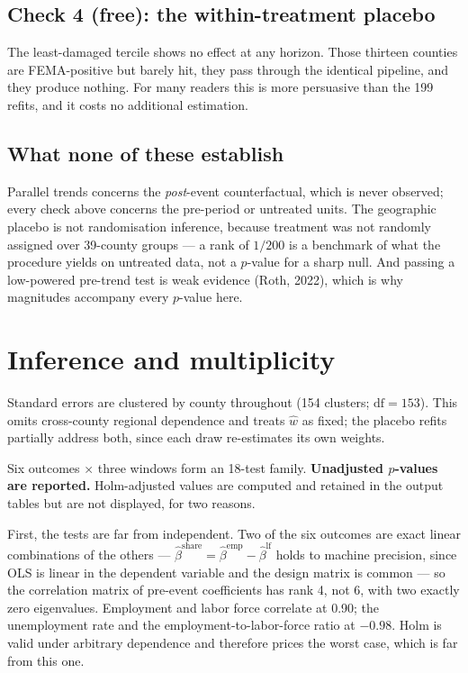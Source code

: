 \documentclass[11pt,a4paper]{article}
\begin{document}
\subsection{Check 4 (free): the within-treatment placebo}
The least-damaged tercile shows no effect at any horizon. Those thirteen counties are FEMA-positive but
barely hit, they pass through the identical pipeline, and they produce nothing. For many readers this
is more persuasive than the 199 refits, and it costs no additional estimation.

\subsection{What none of these establish}
Parallel trends concerns the \emph{post}-event counterfactual, which is never observed; every check
above concerns the pre-period or untreated units. The geographic placebo is not randomisation
inference, because treatment was not randomly assigned over 39-county groups --- a rank of $1/200$ is a
benchmark of what the procedure yields on untreated data, not a $p$-value for a sharp null. And passing
a low-powered pre-trend test is weak evidence (Roth, 2022), which is why magnitudes accompany every
$p$-value here.

\section{Inference and multiplicity}\label{sec:multiplicity}

Standard errors are clustered by county throughout (154 clusters; $\mathrm{df}=153$). This omits
cross-county regional dependence and treats $\widehat w$ as fixed; the placebo refits partially address
both, since each draw re-estimates its own weights.

Six outcomes $\times$ three windows form an 18-test family. \textbf{Unadjusted $p$-values are reported.}
Holm-adjusted values are computed and retained in the output tables but are not displayed, for two
reasons.

First, the tests are far from independent. Two of the six outcomes are exact linear combinations of the
others --- $\hat\beta^{\text{share}}=\hat\beta^{\text{emp}}-\hat\beta^{\text{lf}}$ holds to machine
precision, since OLS is linear in the dependent variable and the design matrix is common --- so the
correlation matrix of pre-event coefficients has rank 4, not 6, with two exactly zero eigenvalues.
Employment and labor force correlate at 0.90; the unemployment rate and the employment-to-labor-force
ratio at $-0.98$. Holm is valid under arbitrary dependence and therefore prices the worst case, which
is far from this one.
\end{document}
